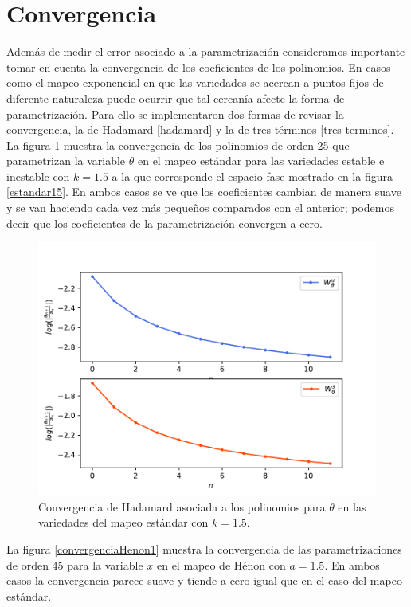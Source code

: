 \section{Convergencia}
Además de medir el error asociado a la parametrización consideramos importante tomar en cuenta la convergencia de los coeficientes de los polinomios. En casos como el mapeo exponencial en que las variedades se acercan a puntos fijos de diferente naturaleza puede ocurrir que tal cercanía afecte la forma de parametrización. Para ello se implementaron dos formas de revisar la convergencia, la de Hadamard \eqref{hadamard} y la de tres términos \eqref{tres terminos}. \\

La figura \ref{convergenciaEst15} muestra la convergencia de los polinomios de orden 25 que parametrizan la variable $\theta$ en el mapeo estándar para las variedades estable e inestable con $k=1.5$ a la que corresponde el espacio fase mostrado en la figura \ref{estandar15}. En ambos casos se ve que los coeficientes cambian de manera suave y se van haciendo cada vez más pequeños comparados con el anterior; podemos decir que los coeficientes de la parametrización convergen a cero.  
\begin{figure}[H]
\centering
\includegraphics[scale=0.5]{converEst15}
\caption{Convergencia de Hadamard asociada a los polinomios para $\theta$ en las variedades del mapeo estándar con $k=1.5$.}
\label{convergenciaEst15}
\end{figure}

La figura \ref{convergenciaHenon1} muestra la convergencia de las parametrizaciones de orden 45 para la variable $x$ en el mapeo de Hénon con $a=1.5$. En ambos casos la convergencia parece suave y tiende a cero igual que en el caso del mapeo estándar.

